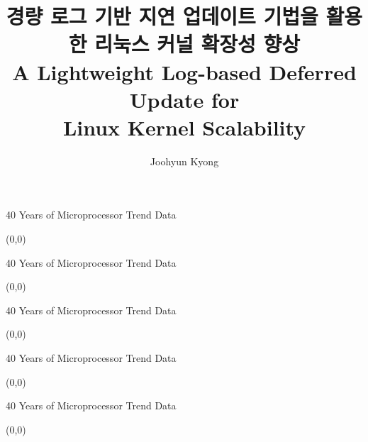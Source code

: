 \documentclass[english]{beamer} %
\begin{document}
\title[Memory Scalability]{
경량 로그 기반 지연 업데이트 기법을 활용한 리눅스 커널 확장성 향상 \\
\small{A Lightweight Log-based Deferred Update
for \\Linux Kernel Scalability}}

\author{Joohyun Kyong}


\begin{frame}
  \titlepage
\end{frame}

\begin{frame}{40 Years of Microprocessor Trend Data}
\begin{textblock}{1}(0,0)
\end{textblock}
\end{frame}


\begin{frame}{40 Years of Microprocessor Trend Data}
\begin{textblock}{1}(0,0)
\end{textblock}
\end{frame}

\begin{frame}{40 Years of Microprocessor Trend Data}
\begin{textblock}{1}(0,0)
\end{textblock}
\end{frame}


\begin{frame}{40 Years of Microprocessor Trend Data}
\begin{textblock}{1}(0,0)
\end{textblock}
\end{frame}


\begin{frame}{40 Years of Microprocessor Trend Data}
\begin{textblock}{1}(0,0)
\end{textblock}
\end{frame}
\end{document}
